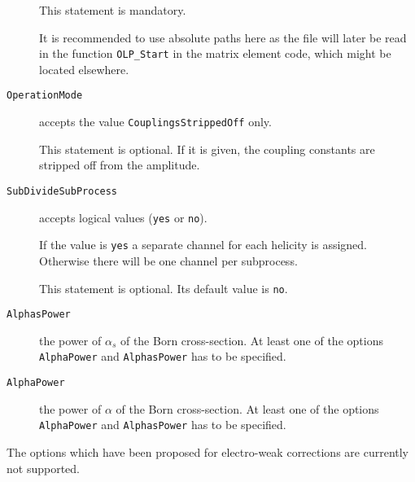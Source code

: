 \begin{description}
	This statement is mandatory.

	It is recommended to use absolute paths here as the file will later
	be read in the function \texttt{OLP\_Start} in the matrix element
	code, which might be located elsewhere.
\item[\texttt{OperationMode}] accepts the value
	\lstinline!CouplingsStrippedOff! only.

	This statement is optional. If it is given, the coupling constants
	are stripped off from the amplitude.
\item[\texttt{SubDivideSubProcess}] accepts logical values
	(\lstinline!yes! or \lstinline!no!).

	If the value is \lstinline!yes! a separate channel for each
	helicity is assigned. Otherwise there will be one channel per
	subprocess.

	This statement is optional. Its default value is \lstinline!no!.
\item[\texttt{AlphasPower}] the power of $\alpha_s$ of the Born cross-section.
	At least one of the options \lstinline!AlphaPower! and
	\lstinline!AlphasPower! has to be specified.
\item[\texttt{AlphaPower}] the power of $\alpha$ of the Born cross-section.
	At least one of the options \lstinline!AlphaPower! and
	\lstinline!AlphasPower! has to be specified.
\end{description}

The options which have been proposed for electro-weak corrections
are currently not supported.

